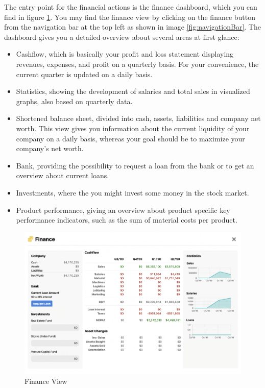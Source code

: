  The entry point for the financial actions is the finance dashboard, which you can find in figure \ref{fig:finance_view}. You may find the finance view by clicking on the finance button from the navigation bar at the top left as shown in image \ref{fig:navigationBar}. The dashboard gives you a detailed overview about several areas at first glance:
\begin{itemize}
    \item Cashflow, which is basically your profit and loss statement displaying revenues, expenses, and profit on a quarterly basis. For your convenience, the current quarter is updated on a daily basis.
    \item Statistics, showing the development of salaries and total sales in visualized graphs, also based on quarterly data.
    \item Shortened balance sheet, divided into cash, assets, liabilities and company net worth. This view gives you information about the current liquidity of your company on a daily basis, whereas your goal should be to maximize your company's net worth.
    \item Bank, providing the possibility to request a loan from the bank or to get an overview about current loans.
    \item Investments, where the you might invest some money in the stock market.
    \item Product performance, giving an overview about product specific key performance indicators, such as the sum of material costs per product.
\end{itemize}
\begin{figure}
    \centering
    \includegraphics [width=\textwidth]{images/financeView.png}
    \caption{Finance View}
    \label{fig:finance_view}
\end{figure}


